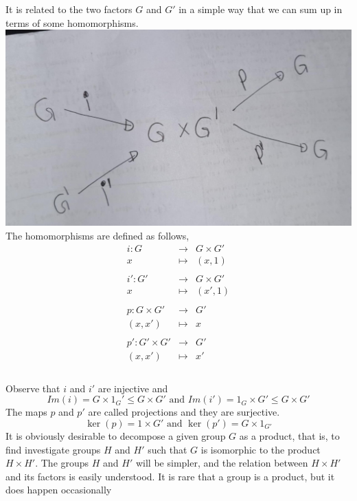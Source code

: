 \documentclass[
]{book}
\theoremstyle{definition}
\theoremstyle{definition}
\theoremstyle{definition}
\theoremstyle{definition}
\theoremstyle{remark}
\begin{document}
It is related to the two factors \(G\) and \(G'\) in a simple way that we can sum up in terms of some homomorphisms.
\includegraphics{figures/ch_2/fig01.jpg}
The homomorphisms are defined as follows,
\begin{eqnarray}
i:G &\rightarrow& G \times G' \\
x &\mapsto& (x,1)\\\\
i':G' &\rightarrow& G \times G' \\
x &\mapsto& (x',1)\\\\
p:G \times G' &\rightarrow& G' \\
(x,x') &\mapsto& x\\\\
p':G' \times G' &\rightarrow& G' \\
(x,x') &\mapsto& x'\\\\
\end{eqnarray}

Observe that \(i\) and \(i'\) are injective and \[Im(i)=G\times 1_G'\leq G\times G' \text{ and }Im(i')=1_G\times G'\leq G\times G'\]
The maps \(p\) and \(p '\) are called projections and they are surjective.
\[\ker(p)=1\times G'\text{ and }\ker(p')=G\times 1_{G'}\]
It is obviously desirable to decompose a given group \(G\) as a product, that is, to find investigate groups \(H\) and \(H '\) such that \(G\) is isomorphic to the product \(H \times H'\). The groups \(H\) and \(H'\) will be simpler, and the relation between \(H\times H'\) and its factors is easily understood. It is rare that a group is a product, but it does happen occasionally
\end{document}
